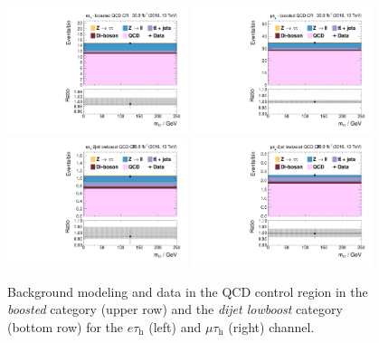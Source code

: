 \begin{figure}[h!]
     \centering
     \includegraphics[width=0.47\textwidth]{Figures/background_estimation/qcd_et_control-regions/htt_inputet14__htt_et_14_13TeV.pdf}
     \includegraphics[width=0.47\textwidth]{Figures/background_estimation/qcd_mt_control-regions/htt_inputmt14__htt_mt_14_13TeV.pdf} \\
     \includegraphics[width=0.47\textwidth]{Figures/background_estimation/qcd_et_control-regions/htt_inputet17__htt_et_17_13TeV.pdf}
     \includegraphics[width=0.47\textwidth]{Figures/background_estimation/qcd_mt_control-regions/htt_inputmt17__htt_mt_17_13TeV.pdf} 
  \caption[QCD control region in the \textit{boosted} and \textit{lowboosted} category.]{Background modeling and data in the QCD control region in the \textit{boosted} category (upper row) and the \textit{dijet lowboost} category (bottom row) for the $e\tau_\text{h}$ (left) and $\mu\tau_\text{h}$ (right) channel.}\label{supp_fig:etmtqcd:1jet_qcd_control}
 \end{figure}%

\clearpage
